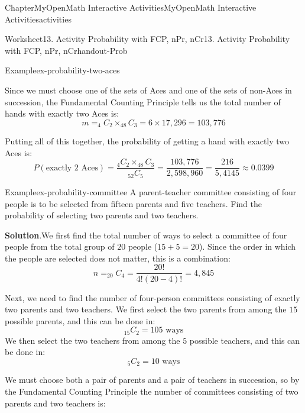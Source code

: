 \documentclass[oneside,10pt,]{book}
\newcommand{\blocktitlefont}{\relax}
\begin{document}
\begin{chapterptx}{Chapter}{MyOpenMath Interactive Activities}{}{MyOpenMath Interactive Activities}{}{}{activities}
\begin{worksheet-section}{Worksheet}{13. Activity Probability with FCP, nPr, nCr}{}{13. Activity Probability with FCP, nPr, nCr}{}{}{handout-Prob}
\begin{example}{Example}{}{ex-probability-two-aces}
\begin{equation*}
\end{equation*}
%
\par
Since we must choose one of the sets of Aces and one of the sets of non-Aces in succession, the Fundamental Counting Principle tells us the total number of hands with exactly two Aces is:%
\begin{equation*}
m = _{4}C_{2} \times _{48}C_{3} = 6 \times 17,296 = 103,776
\end{equation*}
%
\par
Putting all of this together, the probability of getting a hand with exactly two Aces is:%
\begin{equation*}
P(\text{exactly 2 Aces}) = \frac{_{4}C_{2} \times _{48}C_{3}}{_{52}C_{5}} = \frac{103,776}{2,598,960} = \frac{216}{5,4145} \approx 0.0399
\end{equation*}
%
\end{example}
\begin{example}{Example}{}{ex-probability-committee}%
A parent-teacher committee consisting of four people is to be selected from fifteen parents and five teachers. Find the probability of selecting two parents and two teachers.%
\par\smallskip%
\noindent\textbf{\blocktitlefont Solution}.\hypertarget{ex-probability-committee-2}{}\quad{}We first find the total number of ways to select a committee of four people from the total group of \(20\) people (\(15 + 5 = 20\)). Since the order in which the people are selected does not matter, this is a combination:%
\begin{equation*}
n = _{20}C_{4} = \frac{20!}{4!(20-4)!} = 4,845
\end{equation*}
%
\par
Next, we need to find the number of four-person committees consisting of exactly two parents and two teachers. We first select the two parents from among the \(15\) possible parents, and this can be done in:%
\begin{equation*}
_{15}C_{2} = 105 \text{ ways}
\end{equation*}
We then select the two teachers from among the \(5\) possible teachers, and this can be done in:%
\begin{equation*}
_{5}C_{2} = 10 \text{ ways}
\end{equation*}
%
\par
We must choose both a pair of parents and a pair of teachers in succession, so by the Fundamental Counting Principle the number of committees consisting of two parents and two teachers is:%
\begin{equation*}

\end{equation*}
\end{example}
\end{worksheet-section}
\end{chapterptx}
\end{document}
